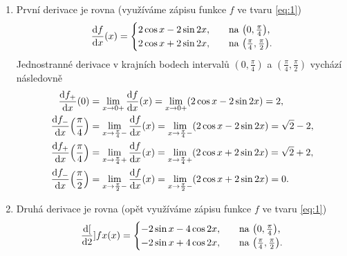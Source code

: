 \documentclass[answers]{exam}
\begin{document}
\begin{questions}
\begin{solution}
\begin{enumerate}
    		\item \label{item:6} První derivace je rovna (využíváme zápisu funkce $f$ ve tvaru \eqref{eq:1})
		    	\begin{equation*}
		    		\dd{f}{x}(x)
		    		=
		    		\begin{cases}
		    			2 \cos x - 2 \sin 2x, &\quad \text{na $\parens{0, \frac{\pi}{4}}$,}
		    			\\
		    			2 \cos x + 2 \sin 2x, &\quad \text{na $\parens{\frac{\pi}{4}, \frac{\pi}{2}}$.}
		    		\end{cases}
		    	\end{equation*}
					Jednostranné derivace v krajních bodech intervalů $(0, \frac{\pi}{4})$ a $(\frac{\pi}{4}, \frac{\pi}{2})$ vychází následovně
					\begin{align*}
						\dd{f_+}{x}(0) 
						&=
						\lim_{x \to 0+} \dd{f}{x}(x) 
						= 
						\lim_{x \to 0+} \parens{2 \cos x - 2 \sin 2x}
						=
						2,
						\\
						\dd{f_-}{x}\parens{\frac{\pi}{4}} 
						&=
						\lim_{x \to \frac{\pi}{4}-} \dd{f}{x}(x) 
						= 
						\lim_{x \to \frac{\pi}{4}-} \parens{2 \cos x - 2 \sin 2x}
						=
						\sqrt{2} - 2,			
						\\
						\dd{f_+}{x}\parens{\frac{\pi}{4}} 
						&=
						\lim_{x \to \frac{\pi}{4}+} \dd{f}{x}(x) 
						= 
						\lim_{x \to \frac{\pi}{4}+} \parens{2 \cos x + 2 \sin 2x}
						=
						\sqrt{2} + 2,
						\\
						\dd{f_-}{x}\parens{\frac{\pi}{2}} 
						&=
						\lim_{x \to \frac{\pi}{2}-} \dd{f}{x}(x) 
						= 
						\lim_{x \to \frac{\pi}{2}-} \parens{2 \cos x + 2 \sin 2x}
						=
						0.								
					\end{align*}
					   		
    		\item Druhá derivace je rovna (opět využíváme zápisu funkce $f$ ve tvaru \eqref{eq:1})
		    	\begin{equation*}
		    		\dd[2]{f}{x}(x)
		    		=
		    		\begin{cases}
		    			- 2 \sin x - 4 \cos 2x, &\quad \text{na $\parens{0, \frac{\pi}{4}}$,}
		    			\\
		    			- 2 \sin x + 4 \cos 2x, &\quad \text{na $\parens{\frac{\pi}{4}, \frac{\pi}{2}}$.}
		    		\end{cases}
		    	\end{equation*}
    			

\end{enumerate}
\end{solution}
\end{questions}
\end{document}
